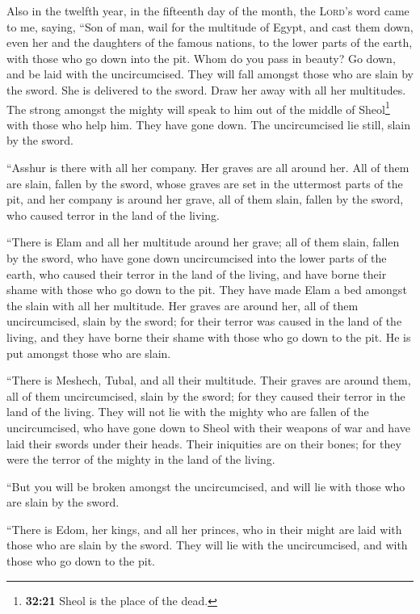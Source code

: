  Also in the twelfth year, in the fifteenth day of the
month, the \textsc{Lord}'s word came to me, saying, 
``Son of man, wail for the multitude of Egypt, and cast them down, even
her and the daughters of the famous nations, to the lower parts of the
earth, with those who go down into the pit.  Whom do you
pass in beauty? Go down, and be laid with the uncircumcised.
 They will fall amongst those who are slain by the sword.
She is delivered to the sword. Draw her away with all her multitudes.
 The strong amongst the mighty will speak to him out of
the middle of Sheol\footnote{\textbf{32:21} Sheol is the place of the
  dead.} with those who help him. They have gone down. The uncircumcised
lie still, slain by the sword.

 ``Asshur is there with all her company. Her graves are
all around her. All of them are slain, fallen by the sword,
 whose graves are set in the uttermost parts of the pit,
and her company is around her grave, all of them slain, fallen by the
sword, who caused terror in the land of the living.

 ``There is Elam and all her multitude around her grave;
all of them slain, fallen by the sword, who have gone down uncircumcised
into the lower parts of the earth, who caused their terror in the land
of the living, and have borne their shame with those who go down to the
pit.  They have made Elam a bed amongst the slain with
all her multitude. Her graves are around her, all of them uncircumcised,
slain by the sword; for their terror was caused in the land of the
living, and they have borne their shame with those who go down to the
pit. He is put amongst those who are slain.

 ``There is Meshech, Tubal, and all their multitude.
Their graves are around them, all of them uncircumcised, slain by the
sword; for they caused their terror in the land of the living.
 They will not lie with the mighty who are fallen of the
uncircumcised, who have gone down to Sheol with their weapons of war and
have laid their swords under their heads. Their iniquities are on their
bones; for they were the terror of the mighty in the land of the living.

 ``But you will be broken amongst the uncircumcised, and
will lie with those who are slain by the sword.

 ``There is Edom, her kings, and all her princes, who in
their might are laid with those who are slain by the sword. They will
lie with the uncircumcised, and with those who go down to the pit.

